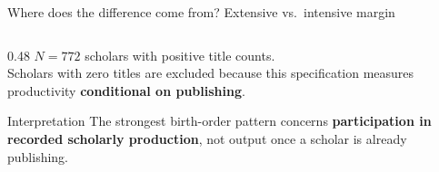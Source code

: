 \documentclass[aspectratio=169,10pt]{beamer}
\begin{document}
\begin{frame}{Where does the difference come from? Extensive vs.\ intensive margin}
\begin{columns}[T,onlytextwidth]
\begin{column}{0.48\textwidth}
{\scriptsize
\(N=772\) scholars with positive title counts.\\
Scholars with zero titles are excluded because this specification
measures productivity \textbf{conditional on publishing}.
}

\vspace{0.35em}

\begin{alertblock}{Interpretation}
\footnotesize
The strongest birth-order pattern concerns
\textbf{participation in recorded scholarly production},
not output once a scholar is already publishing.
\end{alertblock}

\end{column}

\end{columns}

\end{frame}
\end{document}
